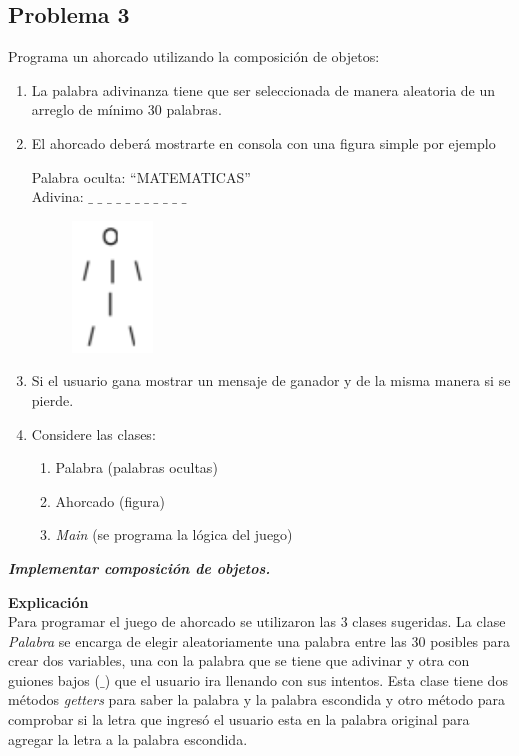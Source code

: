 \documentclass[11pt, twocolumn]{article}
\newcommand{\linejump}{\hfill \break}
\begin{document}
  \subsection*{Problema 3}
  Programa un ahorcado utilizando la composición de objetos:
  \begin{enumerate}[label=\alph*.]
    \item La palabra adivinanza tiene que ser seleccionada de manera aleatoria de un arreglo de mínimo 30 palabras.
    \item El ahorcado deberá mostrarte en consola con una figura simple por ejemplo
    
    Palabra oculta: “MATEMATICAS” \\
    Adivina: $\_$ $\_$ $\_$ $\_$ $\_$ $\_$ $\_$ $\_$ $\_$ $\_$ $\_$

    \begin{figure}[ht]
      \includegraphics[width=0.15\columnwidth, center]{ahorcado.png}
    \end{figure}
    \item Si el usuario gana mostrar un mensaje de ganador y de la misma manera si se pierde.
    \item Considere las clases:
    \begin{enumerate}[label=\roman*.]
      \item Palabra (palabras ocultas)
      \item Ahorcado (figura)
      \item \textit{Main} (se programa la lógica del juego)
    \end{enumerate}
  \end{enumerate}

  \textbf{\textit{Implementar composición de objetos.}}

  \linejump
  \textbf{Explicación} \\
  Para programar el juego de ahorcado se utilizaron las 3 clases sugeridas. La clase \textit{Palabra} se encarga de elegir aleatoriamente una palabra entre las 30 posibles para crear dos variables, una con la palabra que se tiene que adivinar y otra con guiones bajos ($\_$) que el usuario ira llenando con sus intentos. Esta clase tiene dos métodos \textit{getters} para saber la palabra y la palabra escondida y otro método para comprobar si la letra que ingresó el usuario esta en la palabra original para agregar la letra a la palabra escondida. 
  
\end{document}

